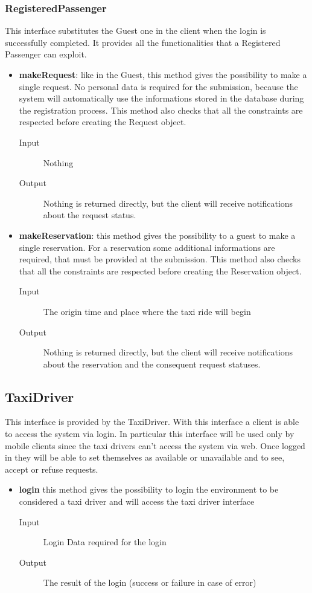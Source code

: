 		\subsubsection{RegisteredPassenger}
		This interface substitutes the Guest one in the client when the login is successfully completed.
		It provides all the	functionalities that a Registered Passenger can exploit.
		\begin{itemize}
			\item \textbf{makeRequest}: like in the Guest, this method gives the possibility to make a single request.
			No personal data is required for the submission, because the system will automatically use the
			informations stored in the database during the registration process. This method also checks that
			all the constraints are respected before creating the Request object.
			\begin{description}
				\item[Input] Nothing
				\item[Output] Nothing is returned directly, but the client will receive notifications about the
				request status.
			\end{description}
			\item \textbf{makeReservation}: this method gives the possibility to a guest to make a single reservation.
			For a reservation some additional informations are required, that must be provided at the submission.
			This method also checks that all the constraints are respected before creating the Reservation object.
			\begin{description}
				\item[Input] The origin time and place where the taxi ride will begin
				\item[Output] Nothing is returned directly, but the client will receive notifications about the
				reservation and the consequent request statuses.
			\end{description}
		\end{itemize}
		\subsection{TaxiDriver}
		This interface is provided by the TaxiDriver. With this interface a client is able to access the system via login. In particular this interface will be used only by mobile clients since the taxi drivers can't access the system via web. Once logged in they will be able to set themselves as available or unavailable and to see, accept or refuse requests.
		\begin{itemize}
			\item \textbf{login} this method gives the possibility to login the environment to be considered
			a taxi driver and will access the taxi driver interface
			\begin{description}
				\item[Input] Login Data required for the login
				\item[Output] The result of the login (success or failure in case of error)
			\end{description}
		\end{itemize}
